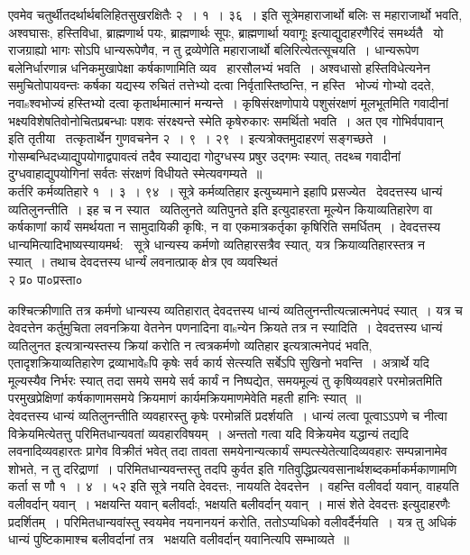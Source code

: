 \documentclass[11pt, openany]{book}
\begin{document}
एवमेव चतुर्थीतदर्थार्थबलिहितसुखरक्षितैः २~। १~। ३६~। इति सूत्रे{\qt महाराजार्थो बलिः स महाराजार्थो भवति, अश्वघासः, हस्तिविधा, ब्राह्मणार्थ पयः, ब्राह्मणार्थः सूपः, ब्राह्मणार्था यवागूः} इत्याद्युदाहरणैरिदं समर्थ्यतै \textendash\ यो राजग्राह्यो भागः सोऽपि धान्यरूपेणैव, न तु द्रव्येणेति महाराजार्थो बलिरित्येतत्सूचयति~। धान्यरूपेण बलेनिर्धारणान्न धनिकमुखापेक्षा कर्षकाणामिति व्यव \textendash\ हारसौलभ्यं भवति~। अश्वधासो हस्तिविधेत्यनेन समुचितोपायवन्तः कर्षका यद्यस्य रुचितं तत्तेभ्यो दत्वा निर्वृतास्तिष्ठन्ति, न हस्ति \textendash\ भोज्यं गोभ्यो ददते, नवाsश्वभोज्यं हस्तिभ्यो दत्वा कृतार्थमात्मानं मन्यन्ते~। कृषिसंरक्षणोपाये पशुसंरक्षणं मूलभूतमिति गवादीनां भक्ष्यविशेषतिवोनोचितप्रबन्धाः पशवः संरक्ष्यन्ते स्मेति कृषेरुकारः समर्थितो भवति~। अत एव {\qt गोभिर्वपावान्} इति तृतीया \textendash\ तत्कृतार्थेन गुणवचनेन २~। ९~। २९~। इत्यत्रोक्तमुदाहरणं सङ्गच्छते~। गोसम्बन्धिदध्याद्युपयोगाद्वपावत्वं तदैव स्याद्यदा गोदुग्धस्य प्रषुर उद्गमः स्यात्, तदथ्च गवादीनां दुग्धवाहाद्युपयोगिनां सर्वतः संरक्षणं विधीयते स्मेत्यवगम्यते~॥\\

कर्तरि कर्मव्यतिहारे १~। ३~। ९४~। सूत्रे कर्मव्यतिहार इत्युच्यमाने इहापि प्रसज्येत \textendash\ देवदत्तस्य धान्यं व्यतिलुनन्तीति~। इह च न स्यात \textendash\ व्यतिलुनते व्यतिपुनते इति इत्युदाहरता मूल्येन कियाव्यतिहारेण वा कर्षकाणां कार्यं समर्थयता न सामुदायिकी कृषिः, न वा एकमात्रकर्तृका कृषिरिति समर्धितम्~। देवदत्तस्य धान्यमित्यादिभाष्यस्यायमर्थ: \textendash\ सूत्रे धान्यस्य कर्मणो व्यतिहारसत्रैव स्यात्, यत्र क्रियाव्यतिहारस्तत्र न स्यात्~। तथाच देवदत्तस्य धार्न्यं लवनात्प्राक् क्षेत्र एव व्यवस्थितं\\

२ प्र० पा०प्रस्ता०

\newpage

\noindent
कश्चित्क्रीणाति तत्र कर्मणो धान्यस्य व्यतिहारात् देवदत्तस्य धान्यं व्यतिलुनन्तीत्यत्न्नात्मनेपदं स्यात्~। यत्र च देवदत्तेन कर्तुमुचिता लवनक्रिया वेतनेन पणनादिना वाsन्येन क्रियते तत्र न स्यादिति~। देवदत्तस्य धान्यं व्यतिलुनत इत्यत्रान्यस्तस्य क्रियां करोति न त्वत्रकर्मणो व्यतिहार इत्यत्रात्मनेपदं भवति, एतादृशक्रियाव्यतिहारेण द्रव्याभावेsपि कृषेः सर्व कार्य सेत्स्यति सर्बेऽपि सुखिनो भवन्ति~। अत्रार्थे यदि मूल्यस्यैव निर्भरः स्यात् तदा समये समये सर्व कार्यं न निष्पद्येत, समयमूल्यं तु कृषिव्यवहारे परमोन्नतमिति परमुखप्रेक्षिणां कर्षकाणामसमये क्रियमाणं कार्यमक्रियमाणमेवेति महती हानिः स्यात्~॥\\

देवदत्तस्य धान्यं व्यतिलुनन्तीति व्यवहारस्तु कृषेः परमोन्नतिं प्रदर्शयति~। धान्यं लत्वा पूत्वाऽऽपणे च नीत्वा विक्रेयमित्येतत्तु परिमितधान्यवतां व्यवहारविषयम्~। अन्ततो गत्वा यदि विक्रेयमेव यद्धान्यं तद्यदि लवनादिव्यवहारतः प्रागेव विक्रीतं भवेत् तदा तावता समयेनान्यत्कार्यं सम्पत्स्येतेत्यादिव्यवहारः सम्पन्नानामेव शोभते, न तु दरिद्राणां~। परिमितधान्यवन्तस्तु तदपि कुर्वत इति गतिवुद्धिप्रत्यवसानार्थशब्दकर्माकर्मकाणामणि कर्ता स णौ १~। ४~। ५२ इति सूत्रे {\qt नयति देवदत्तः, नाययति देवदत्तेन~।} वहन्ति वलीवर्दा यवान्, वाहयति वलीवर्दान् यवान्~। भक्षयन्ति यवान् बलीवर्दाः, भक्षयति बलीवर्दान् यवान्~। मासं शेते देवदत्तः इत्युदाहरणैः प्रदर्शितम्~। परिमितधान्यवांस्तु स्वयमेव नयनानयनं करोति, ततोऽप्यधिको वलीवर्दैर्नयति~। यत्र तु अधिकं धान्यं पुष्टिकामाश्च बलीवर्दानां तत्र \textendash\ भक्षयति वलीवर्दान् यवानित्यपि सम्भाव्यते~॥
\end{document}
